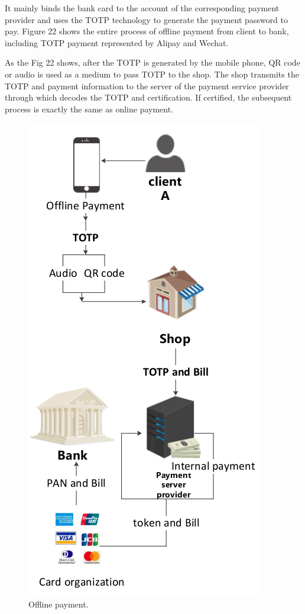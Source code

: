 \documentclass[journal]{IEEEtran}
\begin{document}
It mainly binds the bank card to the account of the corresponding payment provider and uses the TOTP technology to generate the payment password to pay. Figure 22 shows the entire process of offline payment from client to bank, including TOTP payment represented by Alipay and Wechat.

As the Fig 22 shows, after the TOTP is generated by the mobile phone, QR code or audio is used as a medium to pass TOTP to the shop. The shop transmits the TOTP and payment information to the server of the payment service provider through which decodes the TOTP and certification. If certified, the subsequent process is exactly the same as online payment.


\begin{figure}[htbp]
\centerline{\includegraphics[scale=0.5]{Offline_payment.png}}
\caption{Offline payment.}
\label{fig}
\end{figure}
\end{document}
